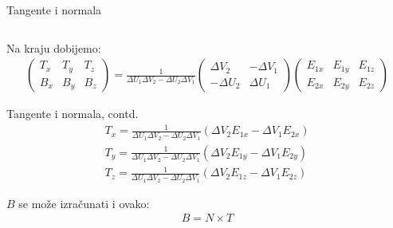 \documentclass[9pt]{beamer}
\begin{document}
\begin{frame}{Tangente i normala}
\begin{columns}
\begin{column}{0.3\textwidth}
\begin{center}
			\end{center}
		\end{column}
	\end{columns}
	Na kraju dobijemo:
	\begin{align*}
	\begin{pmatrix}
	T_x & T_y &  T_z \\
	B_x & B_y &  B_z
	\end{pmatrix} = 
	\frac{1}{\Delta U_1\Delta V_2 - \Delta U_2\Delta V_1}
	\begin{pmatrix}
	\Delta V_2 & -\Delta V_1 \\
	-\Delta U_2 & \Delta U_1
	\end{pmatrix} 
	\begin{pmatrix}
	E_{1x} & E_{1y} & E_{1z} \\
	E_{2x} & E_{2y} & E_{2z}
	\end{pmatrix}
	\end{align*}
\end{frame}
\begin{frame}{Tangente i normala, contd.}
	\begin{align*}
	T_x = \frac{1}{\Delta U_1\Delta V_2 - \Delta U_2\Delta V_1} (\Delta V_2 E_{1x}-\Delta V_1 E_{2x}) \\
	T_y = \frac{1}{\Delta U_1\Delta V_2 - \Delta U_2\Delta V_1} (\Delta V_2 E_{1y}-\Delta V_1 E_{2y}) \\
	T_z = \frac{1}{\Delta U_1\Delta V_2 - \Delta U_2\Delta V_1} (\Delta V_2 E_{1z}-\Delta V_1 E_{2z})
	\end{align*}
	
	$B$ se može izračunati i ovako:
	\begin{align*}
	B = N \times T
	\end{align*}
\end{frame}
\end{document}
